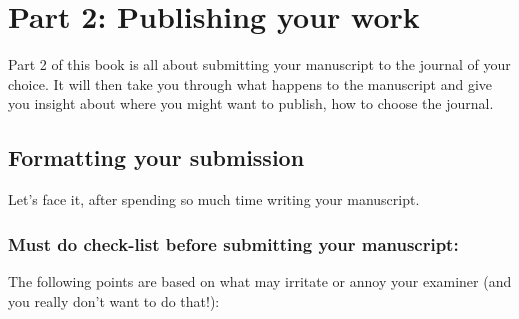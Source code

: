 \documentclass[
]{krantz}
\begin{document}
\hypertarget{part2}{%
\part{Part 2: Publishing your work}\label{part2}}

Part 2 of this book is all about submitting your manuscript to the journal of your choice. It will then take you through what happens to the manuscript and give you insight about where you might want to publish, how to choose the journal.

\hypertarget{formatting}{%
\chapter{Formatting your submission}\label{formatting}}

Let's face it, after spending so much time writing your manuscript.

\hypertarget{must-do-check-list-before-submitting-your-manuscript}{%
\section{Must do check-list before submitting your manuscript:}\label{must-do-check-list-before-submitting-your-manuscript}}

The following points are based on what may irritate or annoy your examiner (and you really don't want to do that!):
\end{document}
